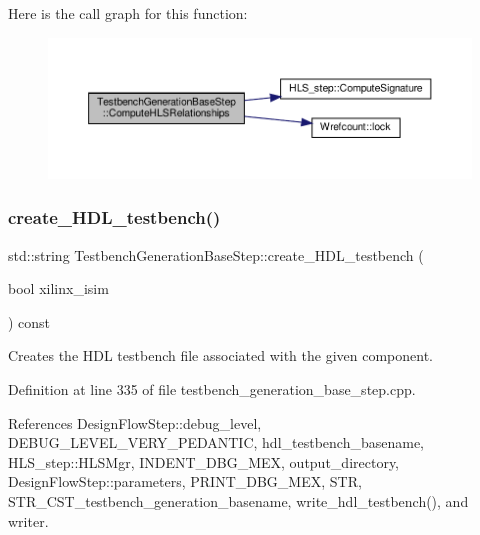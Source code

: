 Here is the call graph for this function\+:
\nopagebreak
\begin{figure}[H]
\begin{center}
\leavevmode
\includegraphics[width=350pt]{dc/d02/classTestbenchGenerationBaseStep_a2eb22c9083dd50cf754d3775697e0de0_cgraph}
\end{center}
\end{figure}
\mbox{\label{classTestbenchGenerationBaseStep_a8165d4d698bb9c74fbfd781a69fbe768}} 
\subsubsection{\texorpdfstring{create\+\_\+\+H\+D\+L\+\_\+testbench()}{create\_HDL\_testbench()}}
{\footnotesize\ttfamily std\+::string Testbench\+Generation\+Base\+Step\+::create\+\_\+\+H\+D\+L\+\_\+testbench (\begin{DoxyParamCaption}\item[{bool}]{xilinx\+\_\+isim }\end{DoxyParamCaption}) const\hspace{0.3cm}{\ttfamily [protected]}}



Creates the H\+DL testbench file associated with the given component. 



Definition at line 335 of file testbench\+\_\+generation\+\_\+base\+\_\+step.\+cpp.



References Design\+Flow\+Step\+::debug\+\_\+level, D\+E\+B\+U\+G\+\_\+\+L\+E\+V\+E\+L\+\_\+\+V\+E\+R\+Y\+\_\+\+P\+E\+D\+A\+N\+T\+IC, hdl\+\_\+testbench\+\_\+basename, H\+L\+S\+\_\+step\+::\+H\+L\+S\+Mgr, I\+N\+D\+E\+N\+T\+\_\+\+D\+B\+G\+\_\+\+M\+EX, output\+\_\+directory, Design\+Flow\+Step\+::parameters, P\+R\+I\+N\+T\+\_\+\+D\+B\+G\+\_\+\+M\+EX, S\+TR, S\+T\+R\+\_\+\+C\+S\+T\+\_\+testbench\+\_\+generation\+\_\+basename, write\+\_\+hdl\+\_\+testbench(), and writer.



